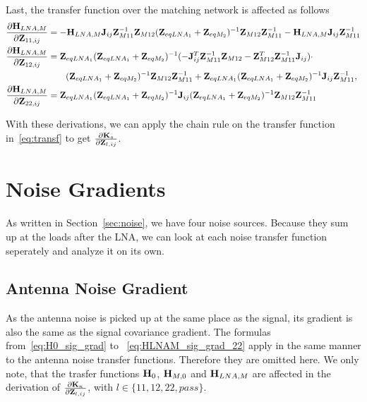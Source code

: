 Last, the transfer function over the matching network is affected as follows
\begin{align}
\label{eq:HLNAM_sig_grad}
\frac{\partial\mathbf{H}_{LNA,M}}{\partial\mathbf{Z}_{11,ij}}&=
-\mathbf{H}_{LNA,M}\mathbf{J}_{ij}\mathbf{Z}_{M11}^{-1}\mathbf{Z}_{M12}(\mathbf{Z}_{eqLNA_1} + \mathbf{Z}_{eqM_2})^{-1}\mathbf{Z}_{M12}\mathbf{Z}_{M11}^{-1}-\mathbf{H}_{LNA,M}\mathbf{J}_{ij}\mathbf{Z}_{M11}^{-1}\\\nonumber
\frac{\partial\mathbf{H}_{LNA,M}}{\partial\mathbf{Z}_{12,ij}}&=
\mathbf{Z}_{eqLNA_1}(\mathbf{Z}_{eqLNA_1} + \mathbf{Z}_{eqM_2})^{-1}(-\mathbf{J}_{ij}^T\mathbf{Z}_{M11}^{-1}\mathbf{Z}_{M12} - \mathbf{Z}_{M12}^T\mathbf{Z}_{M11}^{-1}\mathbf{J}_{ij})\cdot\\
&\qquad(\mathbf{Z}_{eqLNA_1} + \mathbf{Z}_{eqM_2})^{-1}\mathbf{Z}_{M12}\mathbf{Z}_{M11}^{-1} + \mathbf{Z}_{eqLNA_1}(\mathbf{Z}_{eqLNA_1} + \mathbf{Z}_{eqM_2})^{-1}\mathbf{J}_{ij}\mathbf{Z}_{M11}^{-1},\\
\frac{\partial\mathbf{H}_{LNA,M}}{\partial\mathbf{Z}_{22,ij}}&=
\mathbf{Z}_{eqLNA_1}(\mathbf{Z}_{eqLNA_1} + \mathbf{Z}_{eqM_2})^{-1}\mathbf{J}_{ij}(\mathbf{Z}_{eqLNA_1} + \mathbf{Z}_{eqM_2})^{-1}\mathbf{Z}_{M12}\mathbf{Z}_{M11}^{-1}
\label{eq:HLNAM_sig_grad_22}
\end{align}

With these derivations, we can apply the chain rule on the transfer function in~\eqref{eq:transf} to get $\frac{\partial\mathbf{K}_s}{\partial\mathbf{Z}_{l,ij}}$.

\section{Noise Gradients}
\label{sec:noise_gradient}

As written in Section~\ref{sec:noise}, we have four noise sources.
Because they sum up at the loads after the LNA, we can look at each noise transfer function seperately and analyze it on its own.

\subsection{Antenna Noise Gradient}
\label{sec:ant_noise_grad}
As the antenna noise is picked up at the same place as the signal, its gradient is also the same as the signal covariance gradient.
The formulas from~\eqref{eq:H0_sig_grad} to ~\eqref{eq:HLNAM_sig_grad_22} apply in the same manner to the antenna noise transfer functions.
Therefore they are omitted here.
We only note, that the trasfer functions $\mathbf{H}_{0}$, $\mathbf{H}_{M,0}$ and $\mathbf{H}_{LNA,M}$ are affected in the derivation of $\frac{\partial\mathbf{K}_n}{\partial\mathbf{Z}_{l,ij}}$, with $l\in\{11,12,22,pass\}$.

